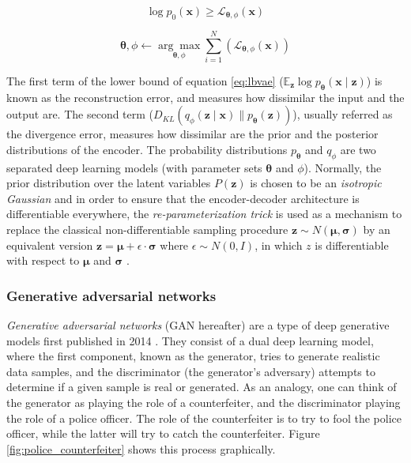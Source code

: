 \begin{equation}
\label{eq:vaelbasloss}
\log p_{0}(\mathbf{x}) \geq \mathcal{L}_{\mathbf{\theta}, \phi}\left(\mathbf{x}\right)
\end{equation}

\begin{equation}
\label{eq:vaeopt}
\mathbf{\theta}, \phi \leftarrow \underset{\mathbf{\theta}, \phi}{\arg \max } \sum_{i=1}^{N}\left(\mathcal{L}_{\mathbf{\theta}, \phi}(\mathbf{x})\right)
\end{equation}

The first term of the lower bound of equation \ref{eq:lbvae} ($\mathbb{E}_{\mathbf{z}} \log p_{\mathbf{\theta}}(\mathbf{x} \mid \mathbf{z})$) is known as the reconstruction error, and measures how dissimilar the input and the output are. The second term ($D_{K L}\left(q_{\phi}(\mathbf{z} \mid \mathbf{x}) \| p_{\mathbf{\theta}}(\mathbf{z})\right)$), usually referred as the divergence error, measures how dissimilar are the prior and the posterior distributions of the encoder. The probability distributions $p_\mathbf{\theta}$ and $q_\phi$ are two separated deep learning models (with parameter sets $\mathbf{\theta}$ and $\phi$). Normally, the prior distribution over the latent variables $P(\mathbf{z})$ is chosen to be an \textit{isotropic Gaussian} \autocite{wei2021} and in order to ensure that the encoder-decoder architecture is differentiable everywhere, the \textit{re-parameterization trick} is used as a mechanism to replace the classical non-differentiable sampling procedure $\mathbf{z} \sim N(\mathbf{\mu}, \mathbf{\sigma})$ by an equivalent version $\mathbf{z} = \mathbf{\mu} + \epsilon \cdot \mathbf{\sigma}$ where $\epsilon \sim N(0,I)$, in which $z$ is differentiable with respect to $\mathbf{\mu}$ and $\mathbf{\sigma}$ \autocite{kingma2019}.


\subsubsection{Generative adversarial networks}
\textit{Generative adversarial networks} (GAN hereafter) are a type of deep generative models first published in 2014 \autocite{Goodfellow2014}. They consist of a dual deep learning model, where the first component, known as the generator, tries to generate realistic data samples, and the discriminator (the generator's adversary) attempts to determine if a given sample is real or generated. As an analogy, one can think of the generator as playing the role of a counterfeiter, and the discriminator playing the role of a police officer. The role of the counterfeiter is to try to fool the police officer, while the latter will try to catch the counterfeiter. Figure \ref{fig:police_counterfeiter} shows this process graphically.

